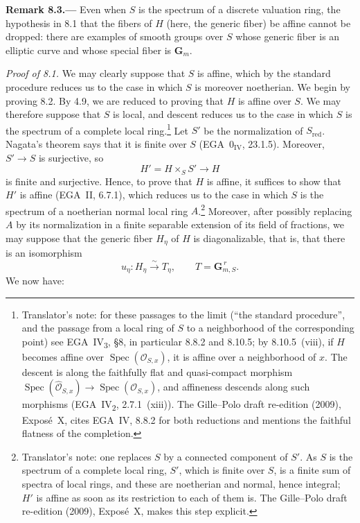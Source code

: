 \par\medskip\noindent{}\textbf{Remark 8.3.---}\enspace
Even when \(S\) is the spectrum of a discrete valuation ring, the
hypothesis in 8.1 that the fibers of \(H\) (here, the generic fiber) be
affine cannot be dropped: there are examples of smooth groups over \(S\)
whose generic fiber is an elliptic curve and whose special fiber is
\(\mathbf{G}_m\).

\medskip
\noindent\emph{Proof of 8.1.}
We may clearly suppose that \(S\) is affine, which by the standard
procedure reduces us to the case in which \(S\) is moreover noetherian.
We begin by proving 8.2. By 4.9, we are reduced to proving that \(H\) is
affine over \(S\). We may therefore suppose that \(S\) is local, and
descent reduces us to the case in which \(S\) is the spectrum of a complete
local ring.\footnote{Translator's note: for these passages to the limit
(``the standard procedure'', and the passage from a local ring of \(S\) to
a neighborhood of the corresponding point) see EGA~IV\textsubscript{3},
\S8, in particular 8.8.2 and 8.10.5; by 8.10.5~(viii), if \(H\) becomes
affine over \(\operatorname{Spec}(\mathcal O_{S,x})\), it is affine over a
neighborhood of \(x\). The descent is along the faithfully flat and
quasi-compact morphism
\(\operatorname{Spec}(\widehat{\mathcal O}_{S,x})\to
\operatorname{Spec}(\mathcal O_{S,x})\), and affineness descends along such
morphisms (EGA~IV\textsubscript{2}, 2.7.1~(xiii)). The Gille--Polo draft re-edition (2009), Exposé~X, cites
EGA~IV, 8.8.2 for both reductions and mentions the faithful flatness of
the completion.} Let \(S'\) be the normalization of \(S_{\mathrm{red}}\).
Nagata's theorem says that it is finite over \(S\)
(EGA~\(0_{\mathrm{IV}}\), 23.1.5). Moreover, \(S'\to S\) is surjective,
so
\[
  H'=H\times_S S'\longrightarrow H
\]
is finite and surjective. Hence, to prove that \(H\) is affine, it suffices
to show that \(H'\) is affine (EGA~II, 6.7.1), which reduces us to the case
in which \(S\) is the spectrum of a noetherian normal local ring
\(A\).\footnote{Translator's note: one replaces \(S\) by a connected
component of \(S'\). As \(S\) is the spectrum of a complete local ring,
\(S'\), which is finite over \(S\), is a finite sum of spectra of local
rings, and these are noetherian and normal, hence integral; \(H'\) is
affine as soon as its restriction to each of them is. The Gille--Polo draft re-edition (2009), Exposé~X, makes
this step explicit.}
Moreover, after possibly replacing \(A\) by its
normalization in a finite separable extension of its field of fractions,
we may suppose that the generic fiber \(H_\eta\) of \(H\) is
diagonalizable, that is, that there is an isomorphism
\[
  u_\eta:H_\eta\xrightarrow{\sim}T_\eta,
  \qquad T=\mathbf{G}_{m,S}^{\,r}.
\]
We now have:

